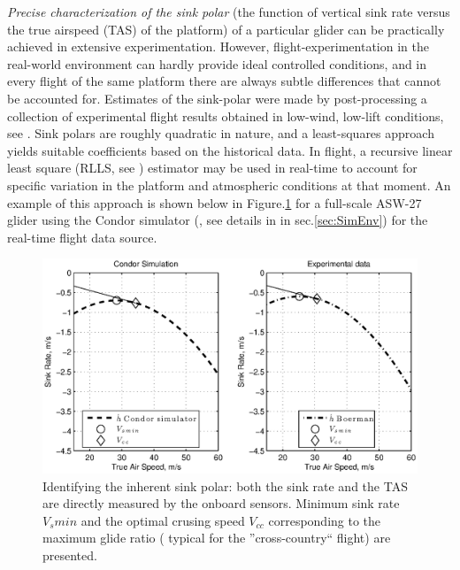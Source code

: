 \documentclass{ifacconf}
\begin{document}
\emph{Precise characterization of the sink polar} (the function of vertical sink rate versus the true airspeed (TAS) of the platform) of a particular glider can be practically achieved in extensive experimentation. However, flight-experimentation in the real-world environment can hardly provide ideal controlled conditions, and in every flight of the same platform there are always subtle differences that cannot be accounted for. Estimates of the sink-polar were made by post-processing a collection of experimental flight results obtained in low-wind, low-lift conditions, see \cite{AKlass_JGCD:2012}. Sink polars are roughly quadratic in nature, and a least-squares approach yields suitable coefficients based on the historical data. In flight, a recursive linear least square (RLLS, see \cite{Astrom:1995}) estimator may be used in real-time to account for specific variation in the platform and atmospheric conditions at that moment. An example of this approach is shown below in Figure.\ref{fig:SinkPolar} for a full-scale ASW-27 glider using the Condor simulator (\cite{Condor:2013:Online}, see details in in sec.\ref{sec:SimEnv}) for the real-time flight data source.

\begin{figure}[thpb]
  \centering
  \includegraphics[scale=0.49]{Figures/Condor_Boermans_comparison.eps}
  \caption{Identifying the inherent sink polar: both the sink rate and the TAS are directly measured by the onboard sensors. Minimum sink rate $V_s min$ and the optimal crusing speed $V_{cc}$ corresponding to the maximum glide ratio ( typical for the ''cross-country`` flight) are presented.}
  \label{fig:SinkPolar}
\end{figure}
\end{document}
